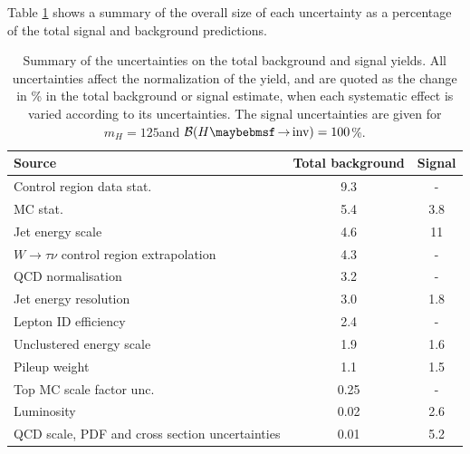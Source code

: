 Table \ref{TABLE:ParkedDataAnalysis_Systematics_Summary} shows a summary of the overall size of each uncertainty as a percentage of the total signal and background predictions.

\begin{table}[!htb]
\centering
\begin{tabular}{|l|c|c|}
\hline 
Source                                            & Total background &     Signal \\
\hline\hline
Control region data stat.                          &            9.3  &          - \\
MC stat.                                           &            5.4  &        3.8 \\
Jet energy scale                                   &            4.6  &         11 \\
$W\rightarrow\tau\nu$ control region extrapolation &            4.3  &          - \\
QCD normalisation                                  &            3.2  &          - \\
Jet energy resolution                              &            3.0  &        1.8 \\
Lepton ID efficiency                               &            2.4  &          - \\
Unclustered energy scale                           &            1.9  &        1.6 \\
Pileup weight                                      &            1.1  &        1.5 \\
Top MC scale factor unc.                           &            0.25 &          - \\
Luminosity                                         &            0.02 &        2.6 \\
QCD scale, PDF and cross section uncertainties     &            0.01 &        5.2 \\
\hline
\end{tabular}
\caption{Summary of the uncertainties on the total background and signal yields. All uncertainties affect the normalization of the yield, and are quoted as the change in \% in the total background or signal estimate, when each systematic effect is varied according to its uncertainties. The signal uncertainties are given for $m_H=125$\GeV and $\BRinv=100$\%. \cite{ARTICLE:CMSVBFHiggsInvisibleParkedAnalysisPAS}}
\label{TABLE:ParkedDataAnalysis_Systematics_Summary}
\end{table}


